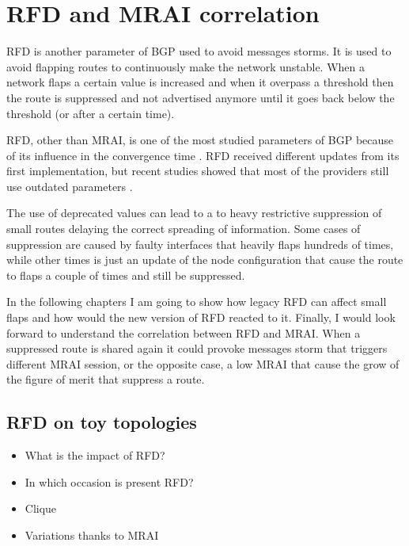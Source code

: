 \chapter{RFD and MRAI correlation}
\label{cha:bgp_rfd}


\ac{RFD} is another parameter of \ac{BGP} used to avoid messages storms.
It is used to avoid flapping routes to continuously make the network unstable.
When a network flaps a certain value is increased and when it overpass a threshold
then the route is suppressed and not advertised anymore until it goes back
below the threshold (or after a certain time).

\ac{RFD}, other than \ac{MRAI}, is one of the most studied parameters of \ac{BGP}
because of its influence in the convergence time \cite{mao2002route,pelsser2011route}.
\ac{RFD} received different updates from its first implementation, but recent 
studies showed that most of the providers still use outdated parameters  \cite{gray2020bgp}.

The use of deprecated values can lead to a to heavy restrictive suppression
of small routes delaying the correct spreading of information.
Some cases of suppression are caused by faulty interfaces that heavily flaps hundreds of times, 
while other times is just an update of the node configuration that
cause the route to flaps a couple of times and still be suppressed.

In the following chapters I am going to show how legacy \ac{RFD} can affect 
small flaps and how would the new version of \ac{RFD} reacted to it.
Finally, I would look forward to understand the correlation between \ac{RFD}
and \ac{MRAI}.
When a suppressed route is shared again it could provoke messages storm that
triggers different \ac{MRAI} session, or the opposite case, a low \ac{MRAI} that
cause the grow of the figure of merit that suppress a route.

\section{RFD on toy topologies}
\label{sec:bgp_rfd_toy}

\begin{itemize}
    \item What is the impact of RFD?
    \item In which occasion is present RFD?
    \item Clique
    \item Variations thanks to MRAI
\end{itemize}

